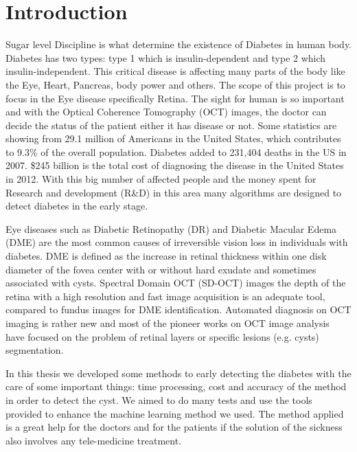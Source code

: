 \chapter{Introduction} \label{chap:intro}


Sugar level Discipline is what determine the existence of Diabetes in human body.
Diabetes has two types: type 1 which is insulin-dependent and type 2 which insulin-independent.
This critical disease is affecting many parts of the body like the Eye, Heart, Pancreas, body power and others.
The scope of this project is to focus in the Eye disease specifically Retina.
The sight for human is so important and with the Optical Coherence Tomography (OCT) images, the doctor can decide the status of the patient either it has disease or not.
Some statistics are showing from \cite{national1995diabetes} 29.1 million of Americans in the United States, which contributes to 9.3\% of the overall population.
Diabetes added to 231,404 deaths in the US in 2007.
\$245 billion is the total cost of diagnosing the disease in the United States in 2012.
With this big number of affected people and the money spent for Research and development (R\&D) in this area many algorithms are designed to detect diabetes in the early stage.

Eye diseases such as Diabetic Retinopathy (DR) and Diabetic Macular Edema (DME) are the most common causes of irreversible vision loss in individuals with diabetes.
DME is defined as the increase in retinal thickness within one disk diameter of the fovea center with or without hard exudate and sometimes associated with cysts.
Spectral Domain OCT (SD-OCT)\cite{cense2004ultrahigh} images the depth of the retina with a high resolution and fast image acquisition is an adequate tool, compared to fundus images for DME identification. Automated diagnosis on OCT imaging is rather new and most of the pioneer works on OCT image analysis have focused on the problem of retinal layers or specific lesions (e.g. cysts) segmentation. 

In this thesis we developed some methods to early detecting the diabetes with the care of some important things: time processing, cost and accuracy of the method in order to detect the cyst. We aimed to do many tests and use the tools provided to enhance the machine learning method we used.
The method applied is a great help for the doctors and for the patients if the solution of the sickness also involves any tele-medicine treatment. 

